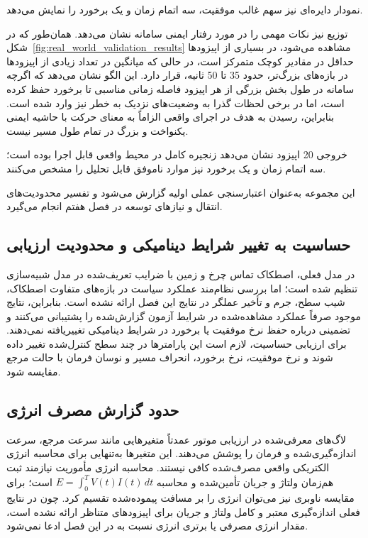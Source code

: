 نمودار دایره‌ای نیز سهم غالب موفقیت، سه اتمام زمان و یک برخورد را نمایش می‌دهد.

توزیع  نیز نکات مهمی را در مورد رفتار ایمنی سامانه نشان می‌دهد. همان‌طور که در شکل~\ref{fig:real_world_validation_results} مشاهده می‌شود، در بسیاری از اپیزودها حداقل  در مقادیر کوچک متمرکز است، در حالی که میانگین  در تعداد زیادی از اپیزودها در بازه‌های بزرگ‌تر، حدود 35 تا 50 ثانیه، قرار دارد. این الگو نشان می‌دهد که اگرچه سامانه در طول بخش بزرگی از هر اپیزود فاصله زمانی مناسبی تا برخورد حفظ کرده است، اما در برخی لحظات گذرا به وضعیت‌های نزدیک به خطر نیز وارد شده است. بنابراین، رسیدن به هدف در اجرای واقعی الزاماً به معنای حرکت با حاشیه ایمنی یکنواخت و بزرگ در تمام طول مسیر نیست.

خروجی 20 اپیزود نشان می‌دهد زنجیره کامل در محیط واقعی قابل اجرا بوده است؛ سه اتمام زمان و یک برخورد نیز موارد ناموفق قابل تحلیل را مشخص می‌کنند.

این مجموعه به‌عنوان اعتبارسنجی عملی اولیه گزارش می‌شود و تفسیر محدودیت‌های انتقال و نیازهای توسعه در فصل هفتم انجام می‌گیرد.

\subsection{حساسیت به تغییر شرایط دینامیکی و محدودیت ارزیابی}
در مدل فعلی، اصطکاک تماس چرخ و زمین با ضرایب تعریف‌شده در مدل شبیه‌سازی تنظیم شده است؛ اما بررسی نظام‌مند عملکرد سیاست در بازه‌های متفاوت اصطکاک، شیب سطح، جرم و تأخیر عملگر در نتایج این فصل ارائه نشده است. بنابراین، نتایج موجود صرفاً عملکرد مشاهده‌شده در شرایط آزمون گزارش‌شده را پشتیبانی می‌کنند و تضمینی درباره حفظ نرخ موفقیت یا برخورد در شرایط دینامیکی تغییر‌یافته نمی‌دهند. برای ارزیابی حساسیت، لازم است این پارامترها در چند سطح کنترل‌شده تغییر داده شوند و نرخ موفقیت، نرخ برخورد، انحراف مسیر و نوسان فرمان با حالت مرجع مقایسه شود.

\subsection{حدود گزارش مصرف انرژی}
لاگ‌های معرفی‌شده در ارزیابی موتور عمدتاً متغیرهایی مانند سرعت مرجع، سرعت اندازه‌گیری‌شده و فرمان  را پوشش می‌دهند. این متغیرها به‌تنهایی برای محاسبه انرژی الکتریکی واقعی مصرف‌شده کافی نیستند. محاسبه انرژی مأموریت نیازمند ثبت هم‌زمان ولتاژ و جریان تأمین‌شده و محاسبه \(E=\int_0^T V(t)I(t)\,dt\) است؛ برای مقایسه ناوبری نیز می‌توان انرژی را بر مسافت پیموده‌شده تقسیم کرد. چون در نتایج فعلی اندازه‌گیری معتبر و کامل ولتاژ و جریان برای اپیزودهای متناظر ارائه نشده است، مقدار انرژی مصرفی یا برتری انرژی نسبت به  در این فصل ادعا نمی‌شود.

